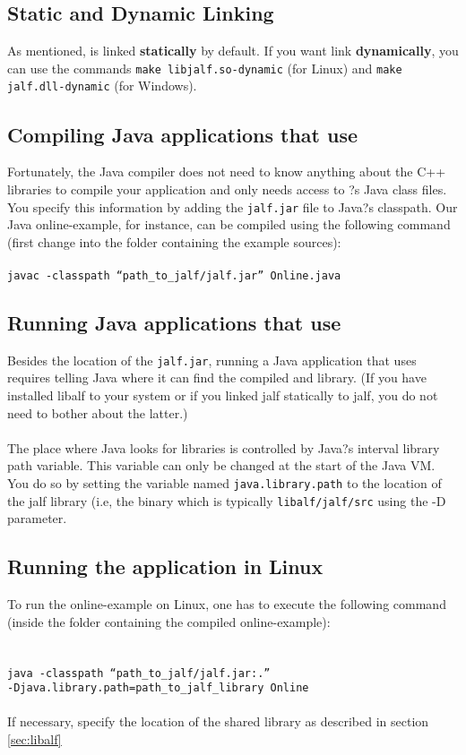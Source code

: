 \subsection*{Static and Dynamic Linking}
As mentioned, \libalf is linked \textbf{statically} by default. If you want link \libalf \textbf{dynamically}, you can use the commands \texttt{make libjalf.so-dynamic} (for Linux) and \texttt{make jalf.dll-dynamic} (for Windows).

\subsection{Compiling Java applications that use \jalf}
Fortunately, the Java compiler does not need to know anything about the C++ libraries to compile your application and only needs access to \jalf?s Java class files. You specify this information by adding the \texttt{jalf.jar} file to Java?s classpath. Our Java online-example, for instance, can be compiled using the following command (first change into the folder containing the example sources):
\\ \\
\texttt{javac -classpath ``path\_to\_jalf/jalf.jar'' Online.java}

\subsection{Running Java applications that use \jalf}
Besides the location of the \texttt{jalf.jar}, running a Java application that uses \jalf requires telling Java where it can find the compiled \jalf and \libalf library. (If you have installed libalf to your system or if you linked jalf statically to jalf, you do not need to bother about the latter.)
\paragraph{}
The place where Java looks for \cpp libraries is controlled by Java?s interval library path variable. This variable can only be changed at the start of the Java VM. You do so by setting the variable named \texttt{java.library.path} to the location of the jalf library (i.e, the \jalf \cpp binary which is typically \texttt{libalf/jalf/src} using the -D parameter. 
\subsection*{Running the application in Linux}
To run the online-example on Linux, one has to execute the following command (inside the folder containing the compiled online-example):
\\ \\ \\
\texttt{java -classpath ``path\_to\_jalf/jalf.jar:.'' \\ \hspace*{25pt} -Djava.library.path=path\_to\_jalf\_library Online}
\\ \\
If necessary, specify the location of the shared \libalf library as described in section \ref{sec:libalf}

